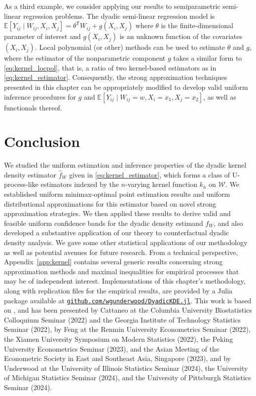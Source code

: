 \documentclass[11pt,lof]{puthesis}
\newcommand{\github}[1]{\href{https://github.com/#1}{\texttt{github.com/#1}}}
\newcommand{\E}{\ensuremath{\mathbb{E}}}
\newcommand{\cW}{\ensuremath{\mathcal{W}}}
\newcommand{\T}{\ensuremath{\mathsf{T}}}
\theoremstyle{break}
\theoremstyle{proof}
\begin{document}
As a third example, we consider applying our results to semiparametric
semi-linear regression problems. The dyadic semi-linear regression model is
$\E[Y_{i j} \mid W_{i j}, X_i, X_j] = \theta^\T W_{i j} + g(X_i, X_j)$
where $\theta$ is the finite-dimensional parameter of interest
and $g(X_i, X_j)$ is an unknown function of the covariates $(X_i, X_j)$.
Local polynomial (or other) methods can be used to estimate $\theta$ and $g$,
where the estimator of the nonparametric component $g$ takes a similar form to
\eqref{eq:kernel_locpol}, that is, a ratio of two kernel-based estimators as in
\eqref{eq:kernel_estimator}. Consequently, the strong approximation techniques
presented in this chapter can be appropriately modified to develop valid
uniform inference procedures for $g$ and
$\E[Y_{i j} \mid W_{i j}=w, X_i=x_1, X_j=x_2]$, as well as functionals thereof.

\section{Conclusion}
\label{sec:kernel_conclusion}

We studied the uniform estimation and inference properties of the dyadic kernel
density estimator $\hat{f}_W$ given in \eqref{eq:kernel_estimator}, which forms
a class of U-process-like estimators indexed by the $n$-varying kernel function
$k_h$ on $\cW$. We established uniform minimax-optimal point estimation results
and uniform distributional approximations for this estimator based on novel
strong approximation strategies. We then applied these results to derive valid
and feasible uniform confidence bands for the dyadic density estimand $f_W$,
and also developed a substantive application of our theory to counterfactual
dyadic density analysis. We gave some other statistical applications of our
methodology as well as potential avenues for future research. From a technical
perspective, Appendix~\ref{app:kernel} contains several generic results
concerning strong approximation methods and maximal inequalities for empirical
processes that may be of independent interest. Implementations of this
chapter's methodology, along with replication files for the empirical results,
are provided by a Julia package available at
\github{wgunderwood/DyadicKDE.jl}.
This work is based on \citet{cattaneo2024uniform},
and has been presented by Cattaneo at
the Columbia University Biostatistics Colloquium Seminar (2022)
and the Georgia Institute of Technology Statistics Seminar (2022),
by Feng at
the Renmin University Econometrics Seminar (2022),
the Xiamen University Symposium on Modern Statistics (2022),
the Peking University Econometrics Seminar (2023),
and the Asian Meeting of the Econometric Society
in East and Southeast Asia, Singapore (2023),
and by Underwood at the University of Illinois Statistics Seminar (2024),
the University of Michigan Statistics Seminar (2024), and the University of
Pittsburgh Statistics Seminar (2024).
\end{document}
